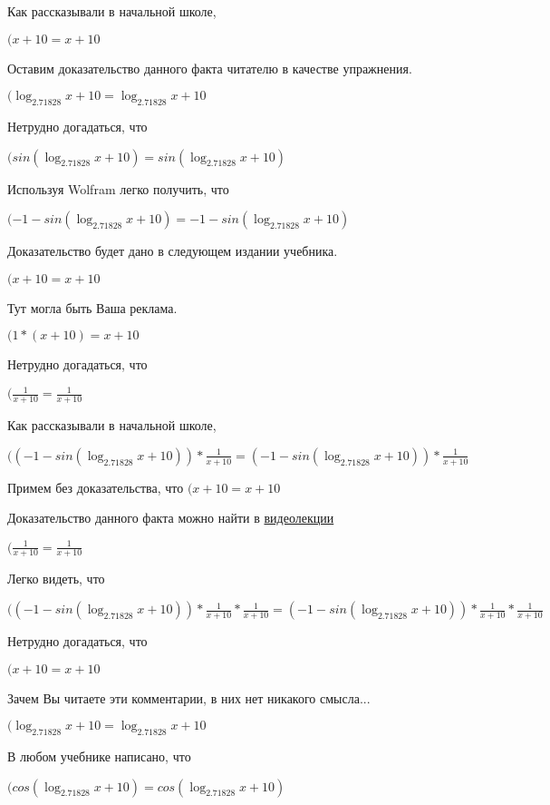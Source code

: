 \documentclass[12pt,a4paper,fleqn]{article}
\theoremstyle{definition}
\begin{document}
Как рассказывали в начальной школе,

$( x  +  10  =  x  +  10 $

Оставим доказательство данного факта читателю в качестве упражнения.

$(\log_{ 2.71828 }{ x  +  10 } = \log_{ 2.71828 }{ x  +  10 }$

Нетрудно догадаться, что

$(sin(\log_{ 2.71828 }{ x  +  10 }) = sin(\log_{ 2.71828 }{ x  +  10 })$

Используя Wolfram легко получить, что

$( -1  - sin(\log_{ 2.71828 }{ x  +  10 }) =  -1  - sin(\log_{ 2.71828 }{ x  +  10 })$

Доказательство будет дано в следующем издании учебника.

$( x  +  10  =  x  +  10 $

Тут могла быть Ваша реклама.

$( 1  * ( x  +  10 ) =  x  +  10 $

Нетрудно догадаться, что

$(\frac{ 1 }{ x  +  10 }
 = \frac{ 1 }{ x  +  10 }
$

Как рассказывали в начальной школе,

$(( -1  - sin(\log_{ 2.71828 }{ x  +  10 })) * \frac{ 1 }{ x  +  10 }
 = ( -1  - sin(\log_{ 2.71828 }{ x  +  10 })) * \frac{ 1 }{ x  +  10 }
$

Примем без доказательства, что
$( x  +  10  =  x  +  10 $

Доказательство данного факта можно найти в \href{https://www.youtube.com/watch?v=dQw4w9WgXcQ}{видеолекции}

$(\frac{ 1 }{ x  +  10 }
 = \frac{ 1 }{ x  +  10 }
$

Легко видеть, что

$(( -1  - sin(\log_{ 2.71828 }{ x  +  10 })) * \frac{ 1 }{ x  +  10 }
 * \frac{ 1 }{ x  +  10 }
 = ( -1  - sin(\log_{ 2.71828 }{ x  +  10 })) * \frac{ 1 }{ x  +  10 }
 * \frac{ 1 }{ x  +  10 }
$

Нетрудно догадаться, что

$( x  +  10  =  x  +  10 $

Зачем Вы читаете эти комментарии, в них нет никакого смысла...

$(\log_{ 2.71828 }{ x  +  10 } = \log_{ 2.71828 }{ x  +  10 }$

В любом учебнике написано, что

$(cos(\log_{ 2.71828 }{ x  +  10 }) = cos(\log_{ 2.71828 }{ x  +  10 })$
\end{document}
